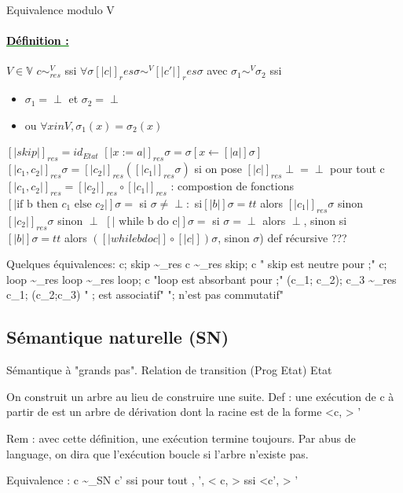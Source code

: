 \documentclass[10pt,a4paper]{article}
\newenvironment{definition}[1]{
	\paragraph{ 	
		\textcolor{green}{
			\underline{ \textcolor{black}{Définition : #1}} } }	} {}
\newcommand{\semm}[1]{\left[| #1 | \right]}
\newcommand{\V}{\mathbb{V}}
\begin{document}
Equivalence modulo V
\begin{definition}{} $V \in \V$
$c \sim^V_{res}$ ssi $\forall \sigma [| c |]_res \sigma \sim^V [| c' |]_res \sigma$
avec $\sigma_1 \sim^V \sigma_2$ ssi \begin{itemize}
\item $\sigma_1 = \perp$ et $\sigma_2 = \perp$
\item ou  $\forall x in V, \sigma_1(x) = \sigma_2(x)$
\end{itemize}
\end{definition}

$\semm{skip}_{res} = id_{Etat}$
$\semm{ x := a }_{res} \sigma = \sigma [ x \leftarrow \semm{a} \sigma ]$
$\semm{c_1, c_2 }_{res} \sigma = \semm{c_2 }_{res} (\semm{c_1}_{res} \sigma)$ si on pose  $\semm{c}_{res} \perp = \perp$ pour tout c
$\semm{c_1, c_2 }_{res} = \semm{c_2 }_{res} \circ \semm{c_1}_{res}$ : compostion de fonctions
$\semm{\text{if b then }c_1\text{ else }c_2 } \sigma =$ si $\sigma \neq \perp :$
si$ \semm{b} \sigma = tt$ alors $\semm{c_1}_{res} \sigma$ sinon  $\semm{c_2}_{res} \sigma$
sinon $\perp$
$\semm{\text{ while b do c} } \sigma=$ si $\sigma = \perp$ alors $\perp$, sinon 
si $\semm{b}\sigma = tt$ alors $(\semm{while b do c } \circ \semm{c}) \sigma$, sinon $\sigma$)
def récursive ???

Quelques équivalences:
c; skip \sim_{res} c \sim_{res} skip; c " skip est neutre pour ;"
c; loop \sim_{res} loop \sim_{res} loop; c "loop est absorbant pour ;"
(c_1; c_2); c_3 \sim_{res} c_1; (c_2;c_3)  " ; est associatif"
 "; n'est pas commutatif"
 
 \subsection{Sémantique naturelle (SN)}
 
 Sémantique à "grands pas".
 Relation de transition \Rightarrow \subseteq (Prog \times Etat) \times Etat
\overline{  <x:=a , \sigma > \Rightarrow \sigma [ x \leftarrow \semm{c } \sigma ] }

On construit un arbre au lieu de construire une suite.
Def : une exécution de c à partir de \sigma est un arbre de dérivation dont la racine est de la forme <c, \sigma > \Rightarrow \sigma'

Rem : avec cette définition, une exécution termine toujours. Par abus de language, on dira que l'exécution boucle si l'arbre n'existe pas.

Equivalence : c \sim_{SN} c' ssi pour tout \sigma, \sigma', < c, \sigma > \Rightarrow ssi <c', \sigma > \Rightarrow \sigma'
\end{document}
